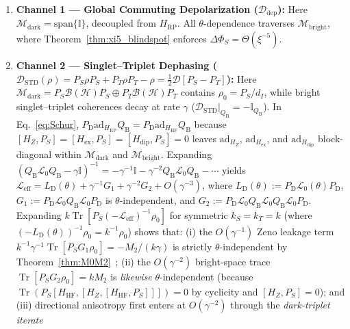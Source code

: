 \documentclass[twocolumn,10pt,amsmath,amssymb,floatfix]{revtex4-2}
\theoremstyle{plain}
\theoremstyle{definition}
\newcommand{\Tr}{\operatorname{Tr}}
\newcommand{\PS}{P_S}
\newcommand{\PT}{P_T}
\newcommand{\HRP}{H_{\mathrm{RP}}}
\newcommand{\HZ}{H_Z}
\newcommand{\HHF}{H_{\mathrm{HF}}}
\newcommand{\Hex}{H_{\mathrm{ex}}}
\newcommand{\Hdip}{H_{\mathrm{dip}}}
\newcommand{\DeltaPhi}{\Delta\Phi_S}
\begin{document}
\begin{enumerate}[leftmargin=1.4em,itemsep=2pt]
\item \textbf{Channel 1 --- Global Commuting Depolarization ($\mathcal{D}_{\mathrm{dep}}$):} Here $\mathcal{M}_{\mathrm{dark}} = \mathrm{span}\{\mathbb{I}\}$, decoupled from $\HRP$. All $\theta$-dependence traverses $\mathcal{M}_{\mathrm{bright}}$, where Theorem~\ref{thm:xi5_blindspot} enforces $\DeltaPhi = \Theta(\xi^{-5})$.
\item \textbf{Channel 2 --- Singlet--Triplet Dephasing ($\mathcal{D}_{\mathrm{STD}}(\rho) = \PS\rho\PS + \PT\rho\PT - \rho = \frac{1}{2}\mathcal{D}[\PS-\PT]$):} Here $\mathcal{M}_{\mathrm{dark}} = \PS\mathcal{B}(\mathcal{H})\PS \oplus \PT\mathcal{B}(\mathcal{H})\PT$ contains $\rho_0 = \PS/d_I$, while bright singlet--triplet coherences decay at rate $\gamma$ ($\mathcal{D}_{\mathrm{STD}}|_{Q_{\mathrm{B}}} = -\mathbb{I}_{Q_{\mathrm{B}}}$). In Eq.~\eqref{eq:Schur}, $P_{\mathrm{D}}\mathrm{ad}_{\HRP}Q_{\mathrm{B}} = P_{\mathrm{D}}\mathrm{ad}_{\HHF}Q_{\mathrm{B}}$ because $[\HZ,\PS]=[\Hex,\PS]=[\Hdip,\PS]=0$ leaves $\mathrm{ad}_{\HZ}$, $\mathrm{ad}_{\Hex}$, and $\mathrm{ad}_{\Hdip}$ block-diagonal within $\mathcal{M}_{\mathrm{dark}}$ and $\mathcal{M}_{\mathrm{bright}}$. Expanding $(Q_{\mathrm{B}}\mathcal{L}_0 Q_{\mathrm{B}} - \gamma\mathbb{I})^{-1} = -\gamma^{-1}\mathbb{I} - \gamma^{-2}Q_{\mathrm{B}}\mathcal{L}_0 Q_{\mathrm{B}} - \cdots$ yields $\mathcal{L}_{\mathrm{eff}} = L_{\mathrm{D}}(\theta) + \gamma^{-1} G_1 + \gamma^{-2} G_2 + O(\gamma^{-3})$, where $L_{\mathrm{D}}(\theta) := P_{\mathrm{D}}\mathcal{L}_0(\theta) P_{\mathrm{D}}$, $G_1 := P_{\mathrm{D}}\mathcal{L}_0 Q_{\mathrm{B}}\mathcal{L}_0 P_{\mathrm{D}}$ is $\theta$-independent, and $G_2 := P_{\mathrm{D}}\mathcal{L}_0 Q_{\mathrm{B}}\mathcal{L}_0 Q_{\mathrm{B}}\mathcal{L}_0 P_{\mathrm{D}}$. Expanding $k\Tr[\PS(-\mathcal{L}_{\mathrm{eff}})^{-1}\rho_0]$ for symmetric $k_S=k_T=k$ (where $(-L_{\mathrm{D}}(\theta))^{-1}\rho_0 = k^{-1}\rho_0$) shows that: (i) the $O(\gamma^{-1})$ Zeno leakage term $k^{-1}\gamma^{-1}\Tr[\PS G_1 \rho_0] = -M_2/(k\gamma)$ is strictly $\theta$-independent by Theorem~\ref{thm:M0M2}~\cite{Dellis2012Biosystems,Tiersch2012PhilTrans}; (ii) the $O(\gamma^{-2})$ bright-space trace $\Tr[\PS G_2 \rho_0] = k M_2$ is \emph{likewise} $\theta$-independent (because $\Tr(\PS[\HHF,[\HZ,[\HHF,\PS]]]) = 0$ by cyclicity and $[\HZ,\PS]=0$); and (iii) directional anisotropy first enters at $O(\gamma^{-2})$ through the \emph{dark-triplet iterate}
\begin{align}
\label{eq:STD_dark_iterate}

\end{align}
\end{enumerate}
\end{document}
